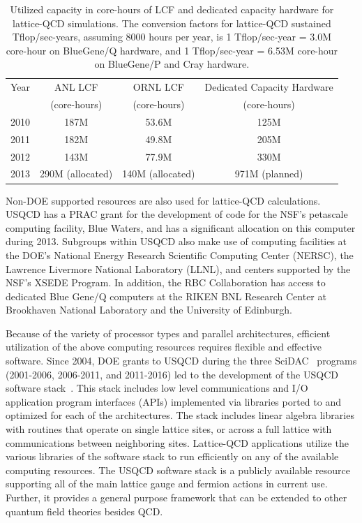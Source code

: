 \begin{table}[t]
\begin{center}
\caption{Utilized capacity in core-hours of LCF and dedicated capacity
hardware for lattice-QCD simulations.  The conversion factors for lattice-QCD
sustained Tflop/sec-years, assuming 8000 hours per year, is 1 Tflop/sec-year =
3.0M core-hour on BlueGene/Q hardware, and 1 Tflop/sec-year = 6.53M core-hour
on BlueGene/P and Cray hardware.\vspace{1.5mm}}
\label{tab:current}
\begin{tabular}{lccc}  
\hline\hline
Year & ANL LCF & ORNL LCF & Dedicated Capacity Hardware \\[-0.75mm]
& (core-hours) & (core-hours) & (core-hours) \\[0.5mm]  \hline
2010 & 187M & 53.6M & 125M \\
2011 & 182M & 49.8M & 205M \\
2012 & 143M & 77.9M & 330M \\
2013 & 290M (allocated) & 140M (allocated) & 971M (planned) \\ \hline\hline
\end{tabular}
\end{center}
\end{table}

Non-DOE supported resources are also used for lattice-QCD calculations.  USQCD
has a PRAC grant for the development of code for the NSF's petascale computing
facility, Blue Waters, and has a significant allocation on this computer
during 2013.  Subgroups within USQCD also make use of computing facilities at
the DOE's National Energy Research Scientific Computing Center (NERSC), the
Lawrence Livermore National Laboratory (LLNL), and centers supported by the
NSF's XSEDE Program.  In addition, the RBC Collaboration has access to
dedicated Blue Gene/Q computers at the RIKEN BNL Research Center at Brookhaven
National Laboratory and the University of Edinburgh.

Because of the variety of processor types and parallel architectures,
efficient utilization of the above computing resources requires flexible and
effective software.  Since 2004, DOE grants to USQCD during the three
SciDAC~\cite{SciDAC} programs (2001-2006, 2006-2011, and 2011-2016) led to the
development of the USQCD software stack~\cite{SciDAC-software}.  This stack
includes low level communications and I/O application program interfaces
(APIs) implemented via libraries ported to and optimized for each of the
architectures.  The stack includes linear algebra libraries with routines that
operate on single lattice sites, or across a full lattice with communications
between neighboring sites.  Lattice-QCD applications utilize the various
libraries of the software stack to run efficiently on any of the available
computing resources.  The USQCD software stack is a publicly available
resource supporting all of the main lattice gauge and fermion actions in
current use.  Further, it provides a general purpose framework that can be
extended to other quantum field theories besides QCD.

